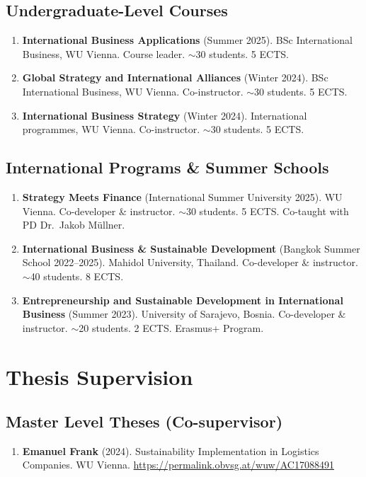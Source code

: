 \documentclass[11pt,a4paper]{article}
\begin{document}
\begin{cv}
\subsection{Undergraduate-Level Courses}
\begin{enumerate}
    \item \textbf{International Business Applications} (Summer 2025). BSc International Business, WU Vienna. Course leader. $\sim$30 students. 5 ECTS.
    \item \textbf{Global Strategy and International Alliances} (Winter 2024). BSc International Business, WU Vienna. Co-instructor. $\sim$30 students. 5 ECTS.
    \item \textbf{International Business Strategy} (Winter 2024). International programmes, WU Vienna. Co-instructor. $\sim$30 students. 5 ECTS.
\end{enumerate}

\subsection{International Programs \& Summer Schools}
\begin{enumerate}
    \item \textbf{Strategy Meets Finance} (International Summer University 2025). WU Vienna. Co-developer \& instructor. $\sim$30 students. 5 ECTS. Co-taught with PD Dr.~Jakob Müllner.
    \item \textbf{International Business \& Sustainable Development} (Bangkok Summer School 2022--2025). Mahidol University, Thailand. Co-developer \& instructor. $\sim$40 students. 8 ECTS.
    \item \textbf{Entrepreneurship and Sustainable Development in International Business} (Summer 2023). University of Sarajevo, Bosnia. Co-developer \& instructor. $\sim$20 students. 2 ECTS. Erasmus+ Program.
\end{enumerate}

\section{Thesis Supervision}

\subsection{Master Level Theses (Co-supervisor)}

\begin{enumerate}
    \item \textbf{Emanuel Frank} (2024). Sustainability Implementation in Logistics Companies. WU Vienna. \url{https://permalink.obvsg.at/wuw/AC17088491}
    

\end{enumerate}
\end{cv}
\end{document}
